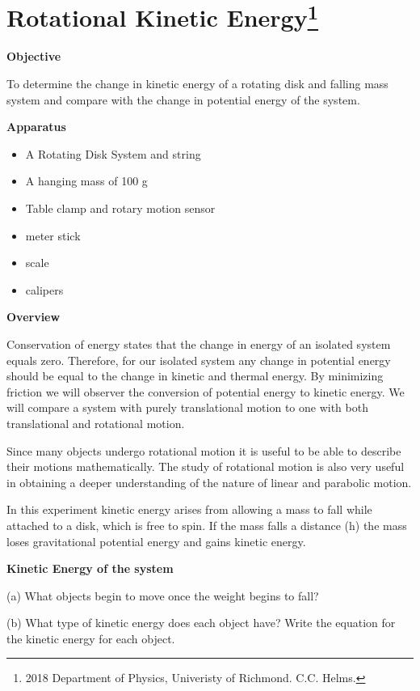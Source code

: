 
\section*{Rotational Kinetic Energy\footnote{
2018 Department of Physics, Univeristy of Richmond. C.C. Helms.
}}

\makelabheader %

\textbf{Objective} 

To determine the change in kinetic energy of a rotating disk and falling mass system and compare with the change in potential energy of the system. 


\textbf{Apparatus}

\begin{itemize}
\item A Rotating Disk System and string
\item A hanging mass of 100 g  
\item Table clamp and rotary motion sensor
\item meter stick
\item scale
\item calipers
\end{itemize}
\textbf{Overview }

Conservation of energy states that the change in energy of an isolated system equals zero. Therefore, for our isolated system any change in potential energy should be equal to the change in kinetic and thermal energy. By minimizing friction we will observer the conversion of potential energy to kinetic energy.  We will compare a system with purely translational motion to one with both translational and rotational motion. 

Since many objects undergo rotational motion it is useful to be able to describe
their motions mathematically. The study of rotational motion is also very useful
in obtaining a deeper understanding of the nature of linear and parabolic motion.

In this experiment kinetic energy arises from allowing a mass to fall while attached to a disk, which is free to spin. If the mass falls a distance (h) the mass loses gravitational potential energy and gains kinetic energy.   


\textbf{Kinetic Energy of the system} 

(a) What objects begin to move once the weight begins to fall?
\answerspace{7mm}

(b) What type of kinetic energy does each object have? Write the equation for the kinetic energy for each object.
\answerspace{7mm}

